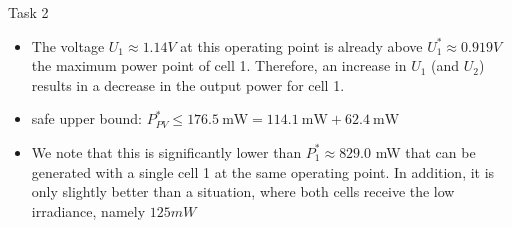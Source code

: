 \begin{frame}[allowframebreaks]{Task 2}{}
  \begin{solutionnoinc}
    \begin{itemize}
      \item The voltage $U_1 \approx 1.14 V$ at this operating point is already above $U_1^* \approx 0.919 V$ the maximum power point of cell 1. Therefore, an increase in $U_1$ (and $U_2$) results in a decrease in the output power for cell 1.
      \item safe upper bound: $P_{P V}^* \leq 176.5 \mathrm{~mW}=114.1 \mathrm{~mW}+62.4 \mathrm{~mW}$
      \item We note that this is significantly lower than $P_1^* \approx 829.0$ mW that can be generated with a single cell 1 at the same operating point. In addition, it is only slightly better than a situation, where both cells receive the low irradiance, namely $125 mW$
    \end{itemize}
  \end{solutionnoinc}
\end{frame}

